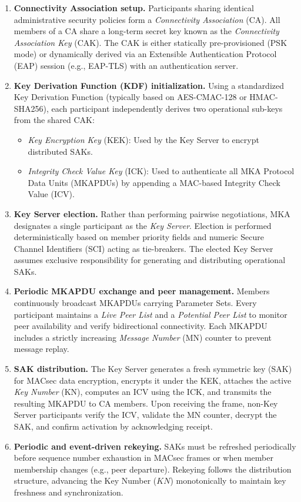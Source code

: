\begin{enumerate}
  \item \textbf{Connectivity Association setup.} Participants sharing identical administrative security policies form a \emph{Connectivity Association} (CA). All members of a CA share a long-term secret key known as the \emph{Connectivity Association Key} (CAK). The CAK is either statically pre-provisioned (PSK mode) or dynamically derived via an Extensible Authentication Protocol (EAP) session (e.g., EAP-TLS) with an authentication server.
  \item \textbf{Key Derivation Function (KDF) initialization.} Using a standardized Key Derivation Function (typically based on AES-CMAC-128 or HMAC-SHA256), each participant independently derives two operational sub-keys from the shared CAK:
  \begin{itemize}
    \item \emph{Key Encryption Key} (KEK): Used by the Key Server to encrypt distributed SAKs.
    \item \emph{Integrity Check Value Key} (ICK): Used to authenticate all MKA Protocol Data Units (MKAPDUs) by appending a MAC-based Integrity Check Value (ICV).
  \end{itemize}
  \item \textbf{Key Server election.} Rather than performing pairwise negotiations, MKA designates a single participant as the \emph{Key Server}. Election is performed deterministically based on member priority fields and numeric Secure Channel Identifiers (SCI) acting as tie-breakers. The elected Key Server assumes exclusive responsibility for generating and distributing operational SAKs.
  \item \textbf{Periodic MKAPDU exchange and peer management.} Members continuously broadcast MKAPDUs carrying Parameter Sets. Every participant maintains a \emph{Live Peer List} and a \emph{Potential Peer List} to monitor peer availability and verify bidirectional connectivity. Each MKAPDU includes a strictly increasing \emph{Message Number} (MN) counter to prevent message replay.
  \item \textbf{SAK distribution.} The Key Server generates a fresh symmetric key (SAK) for MACsec data encryption, encrypts it under the KEK, attaches the active \emph{Key Number} (KN), computes an ICV using the ICK, and transmits the resulting MKAPDU to CA members. Upon receiving the frame, non-Key Server participants verify the ICV, validate the MN counter, decrypt the SAK, and confirm activation by acknowledging receipt.
  \item \textbf{Periodic and event-driven rekeying.} SAKs must be refreshed periodically before sequence number exhaustion in MACsec frames or when member membership changes (e.g., peer departure). Rekeying follows the distribution structure, advancing the Key Number ($KN$) monotonically to maintain key freshness and synchronization.
\end{enumerate}

